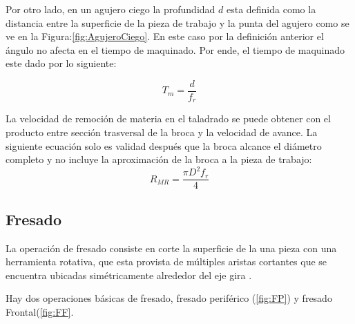 Por otro lado, en un agujero ciego la profundidad $d$ esta definida como la distancia entre la superficie de la pieza de trabajo y la punta del agujero como se ve en la Figura:\ref{fig:AgujeroCiego}. En este caso por la definición anterior el ángulo no afecta en el tiempo de maquinado. Por ende, el tiempo de maquinado este dado por lo siguiente:

\begin{equation}
    T_{m}=\frac{d}{f_{r}}
\end{equation}

La velocidad de remoción de materia en el taladrado se puede obtener con el producto entre sección trasversal de la broca y la velocidad de avance. La siguiente ecuación solo es validad después que la broca alcance el diámetro completo y no incluye la aproximación de la broca a la pieza de trabajo\citep{groover2007fundamentals}:
\begin{equation}
    R_{MR}=\frac{\pi D^{2} f_{r}}{4}
\end{equation}

\subsection*{Fresado} La operación de fresado consiste en corte la superficie de la una pieza con una herramienta rotativa, que esta provista de múltiples aristas cortantes que se encuentra ubicadas simétricamente alrededor del eje gira \citep{Fenoll2009}.

Hay dos operaciones básicas de fresado, fresado periférico (\ref{fig:FP}) y fresado Frontal(\ref{fig:FF}.

